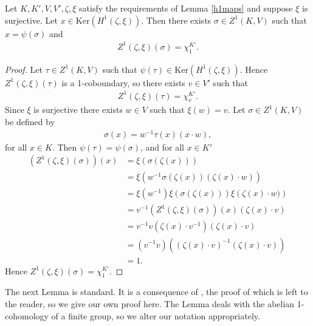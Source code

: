 \begin{lemma}\label{kerh1} Let $K, K', V, V', \zeta, \xi$ satisfy the requirements of Lemma \ref{h1maps} and suppose $\xi$ is surjective. 
Let $x\in \mathrm{Ker}\left(H^1(\zeta, \xi)\right)$. Then there exists $\sigma \in Z^1(K, V)$ such that $x = \psi(\sigma)$ and
\begin{align*}
	Z^1(\zeta, \xi)(\sigma) = \chi^{K'}_1.
\end{align*}
\end{lemma}
\begin{proof}
	Let $\tau \in Z^1(K, V)$ such that $\psi(\tau) \in \mathrm{Ker}\left(H^1(\zeta, \xi)\right)$. Hence $Z^1(\zeta, \xi)(\tau)$ is a 1-coboundary, so there exists $v \in V'$ such that
\begin{align*}
	Z^1(\zeta, \xi)(\tau) = \chi^{K'}_v.
\end{align*}
Since $\xi$ is surjective there exists $w \in V$ such that $\xi(w) = v$.
Let $\sigma \in Z^1(K, V)$ be defined by
\begin{align*}
	\sigma(x) = w^{-1}\tau(x)(x \cdot w),
\end{align*}
for all $x \in K$. Then $\psi(\tau) = \psi(\sigma)$, and for all $x \in K'$
\begin{align*}
	\left(Z^1(\zeta, \xi)(\sigma)\right)(x) &= \xi\left(\sigma(\zeta(x))\right) \\
		&= \xi\left(w^{-1}\sigma(\zeta(x))(\zeta(x)\cdot w )\right) \\
		&= \xi\left(w^{-1}\right)\xi\left(\sigma(\zeta(x))\right)\xi\left(\zeta(x)\cdot w )\right) \\
		&= v^{-1} \left(Z^1(\zeta, \xi)(\sigma)\right)(x) (\zeta(x) \cdot v ) \\
		&= v^{-1} v(\zeta(x) \cdot v^{-1}) (\zeta(x) \cdot v ) \\
		&= (v^{-1} v) \left((\zeta(x) \cdot v)^{-1} (\zeta(x) \cdot v )\right) \\
		&= 1.
\end{align*}
	Hence $Z^1(\zeta, \xi)(\sigma) = \chi^{K'}_1$.
\end{proof}

The next Lemma is standard. It is a consequence of \cite[III.9.5(ii)]{brown1976cohomology}, the proof of which is left to the reader, so we give our own proof here. The Lemma deals with the abelian 1-cohomology of a finite group, so we alter our notation appropriately.

